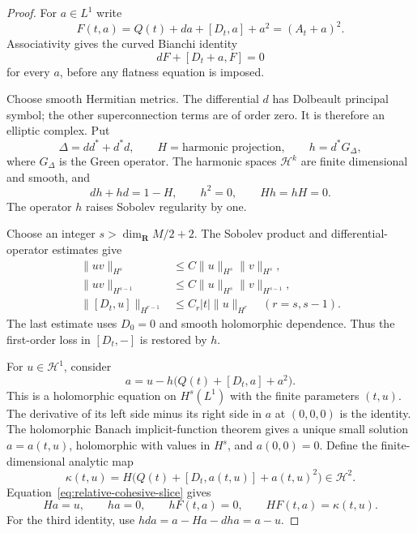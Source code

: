 \documentclass[11pt]{article}
\theoremstyle{definition}
\theoremstyle{remark}
\newcommand{\R}{\mathbf R}
\begin{document}
\begin{proof}
For $a\in L^1$ write
\[
 F(t,a)=Q(t)+da+[D_t,a]+a^2=(A_t+a)^2.
\]
Associativity gives the curved Bianchi identity
\begin{equation}
 dF+[D_t+a,F]=0
 \label{eq:relative-cohesive-bianchi}
\end{equation}
for every $a$, before any flatness equation is imposed.

Choose smooth Hermitian metrics.  The differential $d$ has Dolbeault
principal symbol; the other superconnection terms are of order zero.
It is therefore an elliptic complex.  Put
\[
 \Delta=dd^*+d^*d,\qquad
 H=\text{harmonic projection},\qquad
 h=d^*G_\Delta,
\]
where $G_\Delta$ is the Green operator.  The harmonic spaces
$\mathcal H^k$ are finite dimensional and smooth, and
\begin{equation}
 dh+hd=1-H,\qquad h^2=0,\qquad Hh=hH=0.
 \label{eq:relative-cohesive-homotopy}
\end{equation}
The operator $h$ raises Sobolev regularity by one.

Choose an integer $s>\dim_{\R}M/2+2$.  The Sobolev product and
differential-operator estimates give
\begin{align*}
 \|uv\|_{H^s}&\leq C\|u\|_{H^s}\|v\|_{H^s},\\
 \|uv\|_{H^{s-1}}&\leq C\|u\|_{H^s}\|v\|_{H^{s-1}},\\
 \|[D_t,u]\|_{H^{r-1}}&\leq C_r|t|\|u\|_{H^r}
                         \quad(r=s,s-1).
\end{align*}
The last estimate uses $D_0=0$ and smooth holomorphic dependence.
Thus the first-order loss in $[D_t,-]$ is restored by $h$.

For $u\in\mathcal H^1$, consider
\begin{equation}
 a=u-h\bigl(Q(t)+[D_t,a]+a^2\bigr).
 \label{eq:relative-cohesive-slice}
\end{equation}
This is a holomorphic equation on $H^s(L^1)$ with the finite parameters
$(t,u)$.  The derivative of its left side minus its right side in $a$
at $(0,0,0)$ is the identity.  The holomorphic Banach implicit-function
theorem gives a unique small solution $a=a(t,u)$, holomorphic with
values in $H^s$, and $a(0,0)=0$.  Define the finite-dimensional
analytic map
\[
 \kappa(t,u)=H\bigl(Q(t)+[D_t,a(t,u)]+a(t,u)^2\bigr)
                  \in\mathcal H^2.
\]
Equation~\eqref{eq:relative-cohesive-slice} gives
\[
 Ha=u,\qquad ha=0,\qquad hF(t,a)=0,\qquad HF(t,a)=\kappa(t,u).
\]
For the third identity, use $hda=a-Ha-dha=a-u$.


\end{proof}
\end{document}
